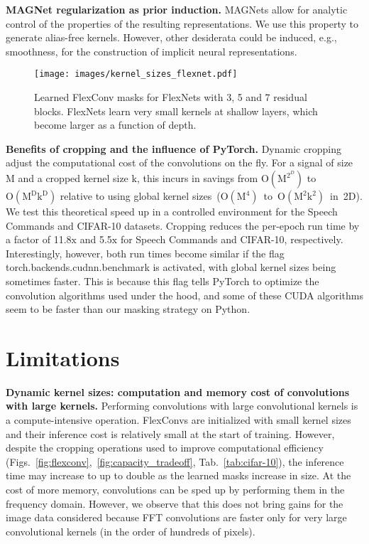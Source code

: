 \documentclass{article} \usepackage{iclr2022_conference,times}
\begin{document}
\textbf{MAGNet regularization as prior induction.} MAGNets allow for analytic control of the properties of the resulting representations. We use this property to generate alias-free kernels. However, other desiderata could be induced, e.g., smoothness, for the construction of implicit neural representations. 
\begin{figure}[t]
    \centering
    \texttt{[image: images/kernel\_sizes\_flexnet.pdf]}
    \vspace{-8mm}
    \caption{Learned FlexConv masks for FlexNets with 3, 5 and 7 residual blocks. FlexNets learn very small kernels at shallow layers, which become larger as a function of depth.
    \vspace{-4mm}}
    \label{fig:c10-kernels}
\end{figure}

\textbf{Benefits of cropping and the influence of {\btt PyTorch}.} Dynamic cropping adjust the computational cost of the convolutions on the fly. For a signal of size $\mathrm{M}$ and a cropped kernel size $\mathrm{k}$, this incurs in savings from $\mathrm{O}(\mathrm{M}^{2^D})$ to $\mathrm{O}(\mathrm{M^D k^D})$ relative to using global kernel sizes~($\mathrm{O}(\mathrm{M}^{4})$~to~$\mathrm{O}(\mathrm{M}^{2}\mathrm{k}^{2})$~in~2D).
We test this theoretical speed up in a controlled environment for the Speech Commands and CIFAR-10 datasets. Cropping reduces the per-epoch run time by a factor of 11.8$\mathrm{x}$ and 5.5$\mathrm{x}$ for Speech Commands and CIFAR-10, respectively. Interestingly, however, both run times become similar if the flag {\btt torch.backends.cudnn.benchmark} is activated, with global kernel sizes being sometimes faster. This is because this flag tells {\btt PyTorch} to optimize the convolution algorithms used under the hood, and some of these CUDA algorithms seem to be faster than our masking strategy on {\btt Python}.
\vspace{-2mm}
\section{Limitations}
\label{sec:limitations}
\vspace{-2mm}
\textbf{Dynamic kernel sizes: computation and memory cost of convolutions with large kernels.} Performing convolutions with large convolutional kernels is a compute-intensive operation. FlexConvs are initialized with small kernel sizes and their inference cost is relatively small at the start of training. However, despite the cropping operations used to improve computational efficiency (Figs.~\ref{fig:flexconv},~\ref{fig:capacity_tradeoff}, Tab.~\ref{tab:cifar-10}), the inference time may increase to up to double as the learned masks increase in size. At the cost of more memory, convolutions can be sped up by performing them in the frequency domain. However, we observe that this does not bring gains for the image data considered because FFT convolutions are faster only for very large convolutional kernels (in the order of hundreds of pixels).
\end{document}
